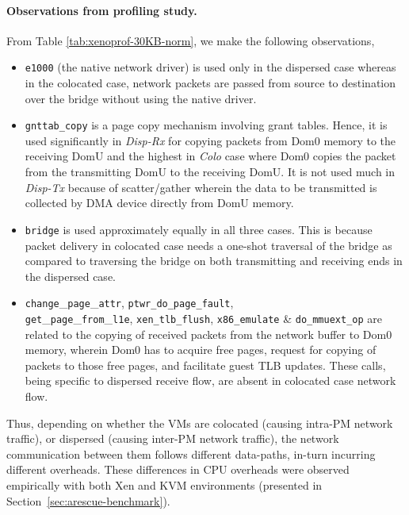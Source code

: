 \paragraph{Observations from profiling study.}
From Table \ref{tab:xenoprof-30KB-norm}, we make the following 
observations,
\begin{itemize}
\item \texttt{e1000} (the native network driver) is used only 
in the dispersed case whereas in the colocated case, network packets are passed 
from source to destination over the bridge without using the native driver.
\item \texttt{gnttab\_copy} is a page copy mechanism involving grant
tables. Hence, it is used significantly in \textit{Disp-Rx} for copying packets
from Dom0 memory to the receiving DomU and the highest in \textit{Colo}
case where Dom0 copies the packet from the transmitting DomU to 
the receiving DomU. It is not used much in \textit{Disp-Tx} 
because of scatter/gather wherein the data to be transmitted is 
collected by DMA device directly from DomU memory. 
\item \texttt{bridge} is used approximately equally in all three cases. 
This is because packet delivery in colocated case needs a one-shot
traversal of the bridge as compared to traversing the bridge on both
transmitting and receiving ends in the dispersed case.
\item \texttt{change}\_\texttt{page}\_\texttt{attr}, 
\texttt{ptwr\_do\_page\_fault}, \\
\texttt{get}\_\texttt{page}\_\texttt{from}\_\texttt{l1e},
\texttt{xen\_tlb\_flush},
\texttt{x86\_emulate}
\& \texttt{do\_mmuext\_op}
are related to the copying of
received packets from the network buffer to Dom0
memory, wherein Dom0 has to acquire free pages, request for copying
of packets to those free pages, and facilitate guest TLB updates.
These calls, being specific to dispersed receive flow, are absent in
colocated case network flow.
\end{itemize}
Thus, depending on whether the VMs are colocated
(causing intra-PM network traffic), 
or dispersed (causing inter-PM network traffic), 
the network communication between them follows
different data-paths, in-turn incurring different overheads.
These differences in CPU overheads were observed empirically with both 
Xen and KVM environments (presented in Section~\ref{sec:arescue-benchmark}). 

